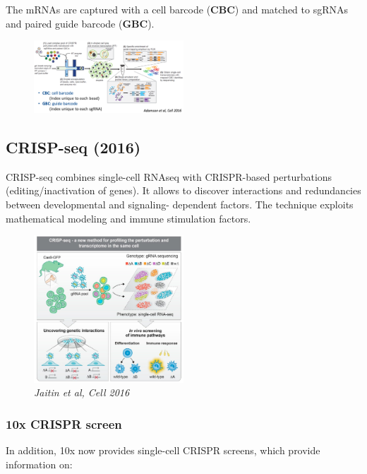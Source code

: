 The mRNAs are captured with a cell barcode (\textbf{CBC}) and matched to
sgRNAs and paired guide barcode (\textbf{GBC}).

\begin{figure}
\centering
\includegraphics[width=0.5\textwidth]{images/Screenshot_12.png}
\caption{}
\end{figure}

\hypertarget{crisp-seq-2016}{%
\subsection{CRISP-seq (2016)}\label{crisp-seq-2016}}

CRISP-seq combines single-cell RNAseq with CRISPR-based perturbations
(editing/inactivation of genes). It allows to discover interactions and
redundancies between developmental and signaling- dependent factors. The
technique exploits mathematical modeling and immune stimulation factors.

\begin{figure}
\centering
\includegraphics[width=0.5\textwidth]{images/Screenshot_13.png}
\caption{\emph{Jaitin et al, Cell 2016}}
\end{figure}

\hypertarget{x-crispr-screen}{%
\subsubsection{10x CRISPR screen}\label{x-crispr-screen}}

In addition, 10x now provides single-cell CRISPR screens, which provide
information on:

